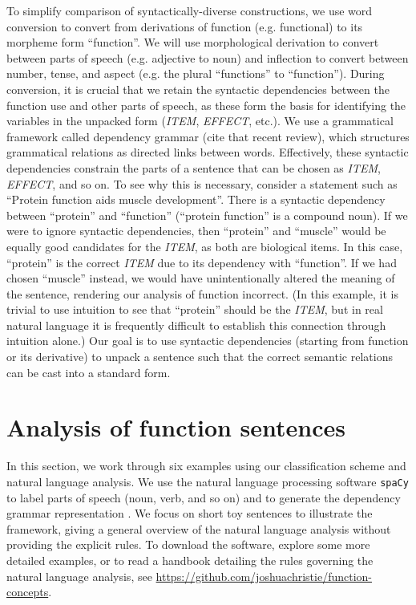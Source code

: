 \documentclass{article}
\begin{document}
To simplify comparison of syntactically-diverse constructions, we use word conversion to convert from derivations of function (e.g. functional) to its morpheme form ``function''.
We will use morphological derivation to convert between parts of speech (e.g. adjective to noun) and inflection to convert between number, tense, and aspect (e.g. the plural ``functions'' to ``function'').
During conversion, it is crucial that we retain the syntactic dependencies between the function use and other parts of speech, as these form the basis for identifying the variables in the unpacked form (\emph{ITEM}, \emph{EFFECT}, etc.).
We use a grammatical framework called dependency grammar (cite that recent review), which structures grammatical relations as directed links between words.
Effectively, these syntactic dependencies constrain the parts of a sentence that can be chosen as \emph{ITEM}, \emph{EFFECT}, and so on.
To see why this is necessary, consider a statement such as ``Protein function aids muscle development''.
There is a syntactic dependency between ``protein'' and ``function'' (``protein function'' is a compound noun).
If we were to ignore syntactic dependencies, then ``protein'' and ``muscle'' would be equally good candidates for the \emph{ITEM}, as both are biological items.
In this case, ``protein'' is the correct \emph{ITEM} due to its dependency with ``function''.
If we had chosen ``muscle'' instead, we would have unintentionally altered the meaning of the sentence, rendering our analysis of function incorrect.
(In this example, it is trivial to use intuition to see that ``protein'' should be the \emph{ITEM}, but in real natural language it is frequently difficult to establish this connection through intuition alone.)
Our goal is to use syntactic dependencies (starting from function or its derivative) to unpack a sentence such that the correct semantic relations can be cast into a standard form.

\section{Analysis of function sentences}
\label{sec:example-sentences}

In this section, we work through six examples using our classification scheme and natural language analysis.
We use the natural language processing software \texttt{spaCy} to label parts of speech (noun, verb, and so on) and to generate the dependency grammar representation \cite{spacy}.
We focus on short toy sentences to illustrate the framework, giving a general overview of the natural language analysis without providing the explicit rules.
To download the software, explore some more detailed examples, or to read a handbook detailing the rules governing the natural language analysis, see
\newline
\href{https://github.com/joshuachristie/function-concepts}{https://github.com/joshuachristie/function-concepts}.
\end{document}
